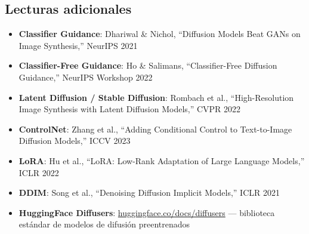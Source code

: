 \subsection{Lecturas adicionales}

\begin{itemize}
    \item \textbf{Classifier Guidance}: Dhariwal \& Nichol, ``Diffusion Models Beat GANs on Image Synthesis,'' NeurIPS 2021
    \item \textbf{Classifier-Free Guidance}: Ho \& Salimans, ``Classifier-Free Diffusion Guidance,'' NeurIPS Workshop 2022
    \item \textbf{Latent Diffusion / Stable Diffusion}: Rombach et al., ``High-Resolution Image Synthesis with Latent Diffusion Models,'' CVPR 2022
    \item \textbf{ControlNet}: Zhang et al., ``Adding Conditional Control to Text-to-Image Diffusion Models,'' ICCV 2023
    \item \textbf{LoRA}: Hu et al., ``LoRA: Low-Rank Adaptation of Large Language Models,'' ICLR 2022
    \item \textbf{DDIM}: Song et al., ``Denoising Diffusion Implicit Models,'' ICLR 2021
    \item \textbf{HuggingFace Diffusers}: \href{https://huggingface.co/docs/diffusers}{huggingface.co/docs/diffusers} — biblioteca estándar de modelos de difusión preentrenados
\end{itemize}



